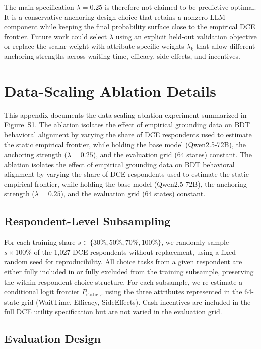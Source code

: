 \documentclass[11pt]{article}
\begin{document}
The main specification \(\lambda=0.25\) is therefore not claimed to be predictive-optimal. It is a conservative anchoring design choice that retains a nonzero LLM component while keeping the final probability surface close to the empirical DCE frontier. Future work could select \(\lambda\) using an explicit held-out validation objective or replace the scalar weight with attribute-specific weights \(\lambda_k\) that allow different anchoring strengths across waiting time, efficacy, side effects, and incentives.


\section{Data-Scaling Ablation Details}\label{sec:data_scaling}
\label{app:data_scaling}

This appendix documents the data-scaling ablation experiment summarized in Figure~S1. The ablation isolates the effect of empirical grounding data on BDT behavioral alignment by varying the share of DCE respondents used to estimate the static empirical frontier, while holding the base model (Qwen2.5-72B), the anchoring strength ($\lambda = 0.25$), and the evaluation grid (64 states) constant. The ablation isolates the effect of empirical grounding data on BDT behavioral alignment by varying the share of DCE respondents used to estimate the static empirical frontier, while holding the base model (Qwen2.5-72B), the anchoring strength ($\lambda = 0.25$), and the evaluation grid (64 states) constant.

\subsection{Respondent-Level Subsampling}
\label{app:subsampling}

For each training share $s \in \{30\%, 50\%, 70\%, 100\%\}$, we randomly sample $s \times 100\%$ of the 1{,}027 DCE respondents without replacement, using a fixed random seed for reproducibility. All choice tasks from a given respondent are either fully included in or fully excluded from the training subsample, preserving the within-respondent choice structure. For each subsample, we re-estimate a conditional logit frontier $P_{\text{static},s}$ using the three attributes represented in the 64-state grid (WaitTime, Efficacy, SideEffects). Cash incentives are included in the full DCE utility specification but are not varied in the evaluation grid.

\subsection{Evaluation Design}
\label{app:evaluation_design}
\end{document}
